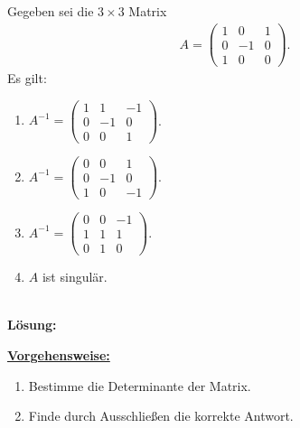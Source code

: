 \subsection*{}
Gegeben sei die $ 3 \times 3 $ Matrix
\begin{align*}
A =
\begin{pmatrix}
1 & 0 & 1 \\
0 & -1 & 0 \\
1 & 0 &0
\end{pmatrix}.
\end{align*}
Es gilt:
\renewcommand{\labelenumi}{(\alph{enumi})}
\begin{enumerate}
	\item 
	$A^{-1}
	= 
	\begin{pmatrix}
	1 & 1 & -1  \\
	0 & -1 & 0 \\
	0 & 0 & 1
	\end{pmatrix}$.
	\item 
	$A^{-1}
	= 
	\begin{pmatrix}
	0 & 0 & 1  \\
	0 & -1 & 0 \\
	1 & 0 & -1
	\end{pmatrix}$.
	\item
	$A^{-1}
	= 
	\begin{pmatrix}
	0 & 0 & -1  \\
	1 & 1 & 1 \\
	0 & 1 & 0
	\end{pmatrix}$.
	\item
	$ A $ ist singulär.
\end{enumerate}
\ \\
\textbf{Lösung:}
\begin{mdframed}
\underline{\textbf{Vorgehensweise:}}
\renewcommand{\labelenumi}{\theenumi.}
\begin{enumerate}
\item 
Bestimme die Determinante der Matrix.
\item
Finde durch Ausschließen die korrekte Antwort.
\end{enumerate}
\end{mdframed}

